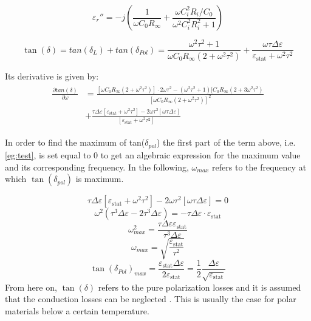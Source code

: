 \begin{equation}
\varepsilon_r'' = -j \left(\frac{1}{\omega C_0 R_\infty}+\frac{\omega C_i^2 R_i / C_0}{\omega^2 C_i^2 R_i^2 +1} \right)
\end{equation}

\begin{equation}
\tan(\delta) = tan(\delta_L) + tan( \delta_{Pol}) = \frac{\omega^2 \tau^2+1}{\omega C_0 R_\infty (2+ \omega^2 \tau^2)}+\frac{\omega \tau \Delta \varepsilon}{\varepsilon_{\textrm{stat}} + \omega^2 \tau^2}
\end{equation}

Its derivative is given by: 
\begin{align}
\begin{split}
\frac{\partial tan(\delta)}{ \partial \omega} & = \frac{[\omega C_0 R_\infty (2+\omega^2 \tau^2)]\cdot 2 \omega \tau^2 - (\omega^2 \tau^2 +1) [C_0 R_\infty (2+3 \omega^2 \tau^2)  }{[\omega C_0 R_\infty (2+\omega^2 \tau^2)]^2}\\
					      & + \frac{\tau \Delta \varepsilon [\varepsilon_{\textrm{stat}} + \omega^2 \tau^2] - 2 \omega \tau^2 [\omega \tau \Delta \varepsilon]}{[\varepsilon_{\textrm{stat}} +\omega^2 \tau^2]}
\label{eg:test}
\end{split}
\end{align}
					      
In order to find the maximum of tan($\delta_{pol}$) the first part of the term above, i.e. \eqref{eg:test}, is set equal to 0 to get an algebraic expression for the maximum value and its corresponding frequency. In the following, $\omega_{max}$ refers to the frequency at which $\tan(\delta_{pol})$ is maximum.

\begin{equation}
\tau \Delta \varepsilon [\varepsilon_{\textrm{stat}} + \omega^2 \tau^2] -2\omega \tau^2 [\omega \tau \Delta \varepsilon] = 0
\end{equation}
\begin{equation}
\omega^2 (\tau^3 \Delta \varepsilon -2 \tau^3 \Delta \varepsilon) = - \tau \Delta \varepsilon \cdot \varepsilon_{\textrm{stat}}
\end{equation}
\begin{equation}
\omega_{max}^2 = \frac{\tau \Delta \varepsilon \varepsilon_{\textrm{stat}}}{\tau^3 \Delta \varepsilon}
\end{equation}
\begin{equation}
\omega_{max} = \sqrt{\frac{\varepsilon_{\textrm{stat}}}{\tau^2}}
\end{equation}
\begin{equation}
\tan(\delta_{Pol})_{max} = \frac{\varepsilon_{\textrm{stat}} \Delta\varepsilon}{2\varepsilon_{\textrm{stat}}} = \frac{1}{2} \frac{\Delta \varepsilon}{\sqrt{\varepsilon_{\textrm{stat}}}}
\end{equation}
From here on, $\tan(\delta)$ refers to the pure polarization losses and it is assumed that the conduction losses can be neglected . This is usually the case for polar materials below a certain temperature. 

